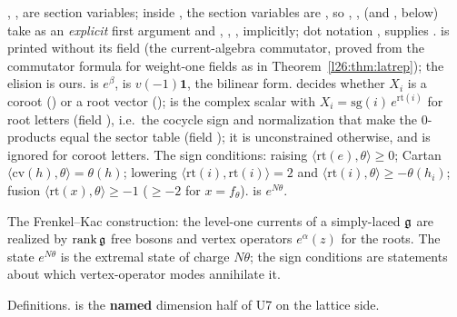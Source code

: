 \begin{dictionary}
, ,  are section variables; inside , the section
variables are , so , ,  (and ,
 below) take  as an \emph{explicit} first argument and , , , 
implicitly; dot notation ,  supplies .  is printed without its  field
(the current-algebra commutator, proved from the commutator formula for weight-one fields as in
Theorem~\ref{l26:thm:latrep}); the elision is ours.  is $e^\beta$,  is $v(-1)\mathbf 1$,
 the bilinear form.  decides whether $X_i$ is a coroot () or a root vector ();
 is the complex scalar with $X_i=\mathrm{sg}(i)\,e^{\mathrm{rt}(i)}$ for root letters (field ), i.e.\ the
cocycle sign and normalization that make the $0$-products equal the sector table (field ); it is unconstrained otherwise,
and is ignored for coroot letters. The sign conditions: raising
$\langle\mathrm{rt}(e),\theta\rangle\ge0$; Cartan $\langle\mathrm{cv}(h),\theta\rangle=\theta(h)$; lowering
$\langle\mathrm{rt}(i),\mathrm{rt}(i)\rangle=2$ and $\langle\mathrm{rt}(i),\theta\rangle\ge-\theta(h_i)$; fusion
$\langle\mathrm{rt}(x),\theta\rangle\ge-1$ ($\ge-2$ for $x=f_\theta$).  is $e^{N\theta}$.
\end{dictionary}

\begin{physics}
The Frenkel--Kac construction: the level-one currents of a simply-laced $\mathfrak g$ are realized by $\operatorname{rank}\mathfrak g$ free
bosons and vertex operators $e^{\alpha}(z)$ for the roots. The state $e^{N\theta}$ is the extremal state of charge $N\theta$; the sign
conditions are statements about which vertex-operator modes annihilate it.
\end{physics}

\begin{status}
Definitions.  is the \textbf{named} dimension half of U7 on the lattice side.
\end{status}

